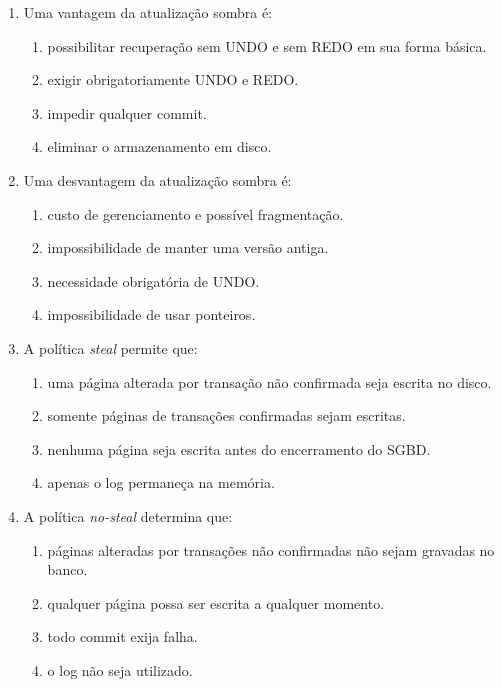 \documentclass[12pt,a4paper]{article}
\begin{document}
\begin{enumerate}[label=\textbf{Q\arabic*.}]
\item Uma vantagem da atualização sombra é:

\begin{enumerate}[label=\alph*)]
    \item possibilitar recuperação sem UNDO e sem REDO em sua forma básica.
    \item exigir obrigatoriamente UNDO e REDO.
    \item impedir qualquer commit.
    \item eliminar o armazenamento em disco.
\end{enumerate}

\item Uma desvantagem da atualização sombra é:

\begin{enumerate}[label=\alph*)]
    \item custo de gerenciamento e possível fragmentação.
    \item impossibilidade de manter uma versão antiga.
    \item necessidade obrigatória de UNDO.
    \item impossibilidade de usar ponteiros.
\end{enumerate}

\item A política \textit{steal} permite que:

\begin{enumerate}[label=\alph*)]
    \item uma página alterada por transação não confirmada seja escrita no disco.
    \item somente páginas de transações confirmadas sejam escritas.
    \item nenhuma página seja escrita antes do encerramento do SGBD.
    \item apenas o log permaneça na memória.
\end{enumerate}

\item A política \textit{no-steal} determina que:

\begin{enumerate}[label=\alph*)]
    \item páginas alteradas por transações não confirmadas não sejam gravadas no banco.
    \item qualquer página possa ser escrita a qualquer momento.
    \item todo commit exija falha.
    \item o log não seja utilizado.
\end{enumerate}


\end{enumerate}
\end{document}
